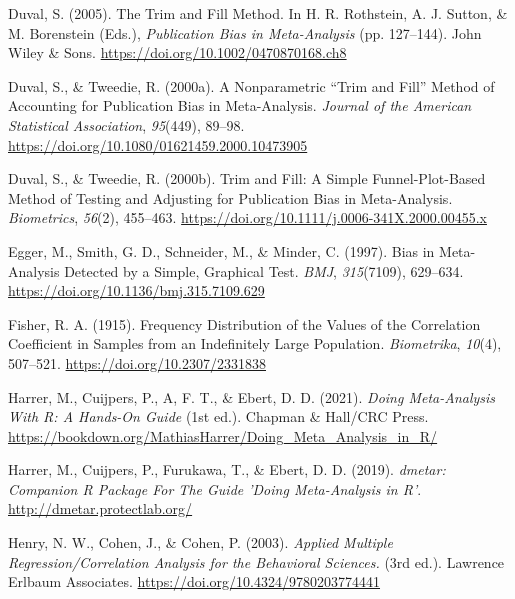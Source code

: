 \documentclass[
  bookmarksnumbered]{article}
\newlength{\cslhangindent}
\newlength{\cslentryspacingunit} %
\newenvironment{CSLReferences}[2] %
 {%
  \setlength{\parindent}{0pt}
  \ifodd #1
  \let\oldpar\par
  \def\par{\hangindent=\cslhangindent\oldpar}
  \fi
  \setlength{\parskip}{#2\cslentryspacingunit}
 }%
 {}
\begin{document}
\begin{CSLReferences}{1}{0}
\leavevmode{}%
Duval, S. (2005). The {Trim} and {Fill Method}. In H. R. Rothstein, A. J. Sutton, \& M. Borenstein (Eds.), \emph{Publication {Bias} in {Meta-Analysis}} (pp. 127--144). {John Wiley \& Sons}. \url{https://doi.org/10.1002/0470870168.ch8}

\leavevmode{}%
Duval, S., \& Tweedie, R. (2000a). A {Nonparametric} {``{Trim} and {Fill}''} {Method} of {Accounting} for {Publication Bias} in {Meta-Analysis}. \emph{Journal of the American Statistical Association}, \emph{95}(449), 89--98. \url{https://doi.org/10.1080/01621459.2000.10473905}

\leavevmode{}%
Duval, S., \& Tweedie, R. (2000b). Trim and {Fill}: {A Simple Funnel-Plot-Based Method} of {Testing} and {Adjusting} for {Publication Bias} in {Meta-Analysis}. \emph{Biometrics}, \emph{56}(2), 455--463. \url{https://doi.org/10.1111/j.0006-341X.2000.00455.x}

\leavevmode{}%
Egger, M., Smith, G. D., Schneider, M., \& Minder, C. (1997). {Bias in Meta-Analysis Detected by a Simple, Graphical Test}. \emph{BMJ}, \emph{315}(7109), 629--634. \url{https://doi.org/10.1136/bmj.315.7109.629}

\leavevmode{}%
Fisher, R. A. (1915). Frequency {Distribution} of the {Values} of the {Correlation Coefficient} in {Samples} from an {Indefinitely Large Population}. \emph{Biometrika}, \emph{10}(4), 507--521. \url{https://doi.org/10.2307/2331838}

\leavevmode{}%
Harrer, M., Cuijpers, P., A, F. T., \& Ebert, D. D. (2021). \emph{{Doing Meta-Analysis With {R}: A Hands-On Guide}} (1st ed.). Chapman \& Hall/CRC Press. \url{https://bookdown.org/MathiasHarrer/Doing_Meta_Analysis_in_R/}

\leavevmode{}%
Harrer, M., Cuijpers, P., Furukawa, T., \& Ebert, D. D. (2019). \emph{{dmetar: Companion R Package For The Guide 'Doing Meta-Analysis in R'}}. \url{http://dmetar.protectlab.org/}

\leavevmode{}%
Henry, N. W., Cohen, J., \& Cohen, P. (2003). \emph{Applied {Multiple Regression}/{Correlation Analysis} for the {Behavioral Sciences}.} (3rd ed.). {Lawrence Erlbaum Associates}. \url{https://doi.org/10.4324/9780203774441}


\end{CSLReferences}
\end{document}
